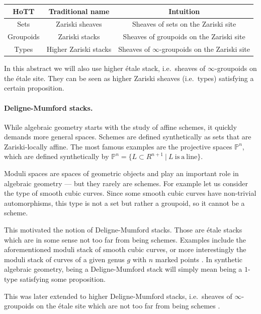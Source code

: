 \documentclass[letterpaper]{../../util/easychair}
\newcommand{\bP}{\mathbb{P}}
\begin{document}
\medbreak

\begin{tabular}{|c|c|c|}
\hline
HoTT & Traditional name & Intuition \\
\hline
Sets & Zariski sheaves & Sheaves of sets on the Zariski site\\
Groupoids & Zariski stacks & Sheaves of groupoids on the Zariski site\\
Types & Higher Zariski stacks & Sheaves of $\infty$-groupoids on the Zariski site\\
\hline
\end{tabular}

\medbreak

In this abstract we will also use higher étale stack, i.e.\ sheaves of $\infty$-groupoids on the étale site. They can be seen as higher Zariski sheaves (i.e.\ types) satisfying a certain proposition.

\paragraph*{Deligne-Mumford stacks.}

While algebraic geometry starts with the study of affine schemes, it quickly demands more general spaces. Schemes are  defined synthetically as sets that are Zariski-locally affine. The most famous examples are the projective spaces $\bP^n$, which are defined synthetically by $\bP^n = \{L\subset R^{n+1}\ |\ L\ \mathrm{is\ a\ line}\}$.

Moduli spaces are spaces of geometric objects and play an important role in algebraic geometry --- but they rarely are schemes. For example let us consider the type of smooth cubic curves. Since some smooth cubic curves have non-trivial automorphisms, this type is not a set but rather a groupoid, so it cannot be a scheme. 

This motivated the notion of Deligne-Mumford stacks. Those are étale stacks which are in some sense not too far from being schemes. Examples include the aforementioned moduli stack of smooth cubic curves, or more interestingly the moduli stack of curves of a given genus $g$ with \(n\) marked points \cite{silverman2009arithmetic,olsson2023algebraic}. In synthetic algebraic geometry, being a Deligne-Mumford stack will simply mean being a $1$-type satisfying some proposition.

This was later extended to higher Deligne-Mumford stacks, i.e.\ sheaves of $\infty$-groupoids on the étale site which are not too far from being schemes \cite{simpson1996algebraic}.
\end{document}
